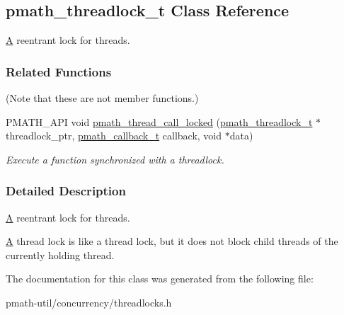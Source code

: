 \hypertarget{classpmath__threadlock__t}{
\subsection{pmath\_\-threadlock\_\-t Class Reference}
\label{classpmath__threadlock__t}
}
\hyperlink{class_a}{A} reentrant lock for threads.  


\subsubsection*{Related Functions}
(Note that these are not member functions.) \begin{CompactItemize}
\item 
PMATH\_\-API void \hyperlink{group__threads_gfcbd1d376791cb95a78e102366b7b79a}{pmath\_\-thread\_\-call\_\-locked} (\hyperlink{classpmath__threadlock__t}{pmath\_\-threadlock\_\-t} $\ast$threadlock\_\-ptr, \hyperlink{group__general__types_ge1a454657f18f3cc54508adeccccbcbc}{pmath\_\-callback\_\-t} callback, void $\ast$data)
\begin{CompactList}\small\item\em Execute a function synchronized with a threadlock. \item\end{CompactList}\end{CompactItemize}


\subsubsection{Detailed Description}
\hyperlink{class_a}{A} reentrant lock for threads. 

\hyperlink{class_a}{A} thread lock is like a thread lock, but it does not block child threads of the currently holding thread. 

The documentation for this class was generated from the following file:\begin{CompactItemize}
\item 
pmath-util/concurrency/threadlocks.h\end{CompactItemize}
